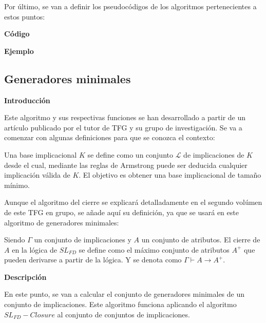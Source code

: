         Por \'ultimo, se van a definir los pseudoc\'odigos de los algoritmos pertenecientes a estos puntos: 

        \bigskip

        
    
        \bigskip

        
    
        \bigskip

        
    
        \bigskip


    
        \textbf{C\'odigo}
    
    
        \textbf{Ejemplo}


        
\subsection{Generadores minimales}


    \textbf{Introducci\'on}

    Este algoritmo y sus respectivas funciones se han desarrollado a partir de un art\'iculo publicado por el tutor de 
    TFG y su grupo de investigaci\'on\cite{cla2012}.
    Se va a comenzar con algunas definiciones para que se conozca el contexto:

    Una base implicacional \(K\) se define como un conjunto \(\mathcal{L}\) de implicaciones de \(K\) desde el cual, mediante las reglas de 
    Armstrong puede ser deducida cualquier implicaci\'on v\'alida de \(K\). El objetivo es obtener una base implicacional de tama\~no 
    m\'inimo.

    Aunque el algoritmo del cierre se explicar\'a detalladamente en el segundo vol\'umen de este TFG en grupo, se a\~nade aqu\'i su 
    definici\'on, ya que se usar\'a en este algoritmo de generadores minimales:

    Siendo \(\Gamma\) un conjunto de implicaciones y \(A\) un conjunto de atributos. El cierre de \(A\) en la l\'ogica de \(SL_{FD}\) se define como 
    el m\'aximo conjunto de atributos \(A^+\) que pueden derivarse a partir de la l\'ogica. Y se denota como \(\Gamma \vdash A \rightarrow A^+\).


    \bigskip
    \textbf{Descripci\'on}

    En este punto, se van a calcular el conjunto de generadores minimales de un conjunto de implicaciones. Este algoritmo funciona aplicando 
    el algoritmo \(SL_{FD}-Closure\) al conjunto de conjuntos de implicaciones.

